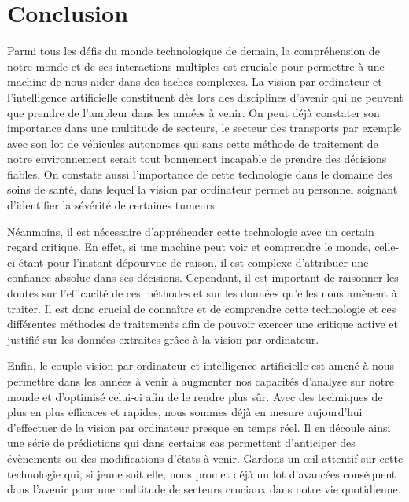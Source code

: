 \documentclass[a4paper,12pt]{article} %
\begin{document}
\section{Conclusion} %
Parmi tous les défis du monde technologique de demain, la compréhension de notre monde et de ses interactions multiples est cruciale pour permettre à une machine de nous aider dans des taches complexes. La vision par ordinateur et l’intelligence artificielle constituent dès lors des disciplines d’avenir qui ne peuvent que prendre de l’ampleur dans les années à venir. On peut déjà constater son importance dans une multitude de secteurs, le secteur des transports par exemple avec son lot de véhicules autonomes qui sans cette méthode de traitement de notre environnement serait tout bonnement incapable de prendre des décisions fiables. On constate aussi l’importance de cette technologie dans le domaine des soins de santé, dans lequel la vision par ordinateur permet au personnel soignant d’identifier la sévérité de certaines tumeurs. \newline
\par
	Néanmoins, il est nécessaire d’appréhender cette technologie avec un certain regard critique. En effet, si une machine peut voir et comprendre le monde, celle-ci étant pour l’instant dépourvue de raison, il est complexe d’attribuer une confiance absolue dans ses décisions. Cependant, il est important de raisonner les doutes sur l’efficacité de ces méthodes et sur les données qu’elles nous amènent à traiter. Il est donc crucial de connaître et de comprendre cette technologie et ces différentes méthodes de traitements afin de pouvoir exercer une critique active et justifié sur les données extraites grâce à la vision par ordinateur. \newline
\par
	Enfin, le couple vision par ordinateur et intelligence artificielle est amené à nous permettre dans les années à venir à augmenter nos capacités d’analyse sur notre monde et d’optimisé celui-ci afin de le rendre plus sûr. Avec des techniques de plus en plus efficaces et rapides, nous sommes déjà en mesure aujourd’hui d’effectuer de la vision par ordinateur presque en temps réel. Il en découle ainsi une série de prédictions qui dans certains cas permettent d’anticiper des évènements ou des modifications d’états à venir. Gardons un œil attentif sur cette technologie qui, si jeune soit elle, nous promet déjà un lot d’avancées conséquent dans l’avenir pour une multitude de secteurs cruciaux dans notre vie quotidienne. 
\newpage

\nocite {*}

\end{document}
